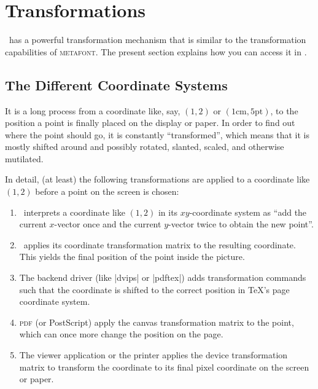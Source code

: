 %
%
%


\section[tikz-transformations]{Transformations}

\pgfname\ has a powerful transformation mechanism that is similar to the
transformation capabilities of \textsc{metafont}. The present section explains
how you can access it in \tikzname.


\subsection{The Different Coordinate Systems}

It is a long process from  a coordinate like, say, $(1,2)$ or
$(1\mathrm{cm},5\mathrm{pt})$, to the position a point is finally placed on the
display or paper. In order to find out where the point should go, it is
constantly ``transformed'', which means that it is mostly shifted around and
possibly rotated, slanted, scaled, and otherwise mutilated.

In detail, (at least) the following transformations are applied to a coordinate
like $(1,2)$ before a point on the screen is chosen:
%
\begin{enumerate}
    \item \pgfname\ interprets a coordinate like $(1,2)$  in its
        $xy$-coordinate system as ``add the current $x$-vector once and the
        current $y$-vector twice to obtain the new point''.
    \item \pgfname\ applies its coordinate transformation matrix to the
        resulting coordinate. This yields the final position of the point
        inside the picture.
    \item The backend driver (like |dvips| or |pdftex|) adds transformation
        commands such that the coordinate is shifted to the correct position in
        \TeX's page coordinate system.
    \item \textsc{pdf} (or PostScript) apply the canvas transformation matrix
        to the point, which can once more change the position on the page.
    \item The viewer application or the printer applies the device
        transformation matrix to transform the coordinate to its final pixel
        coordinate on the screen or paper.
\end{enumerate}

